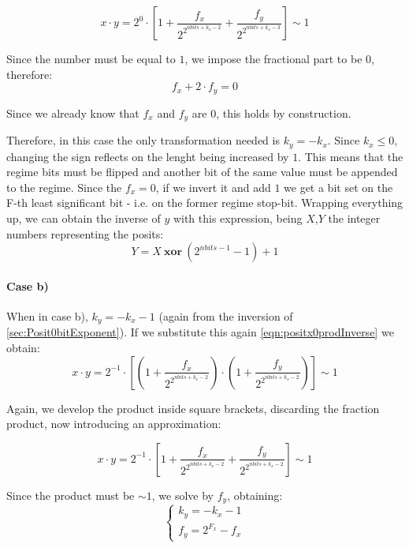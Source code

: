 \begin{equation}
    x \cdot y = 2^{0} \cdot \left[ 1 + \frac{f_x}{2^{2^{nbits + k_x - 2}}}  + \frac{f_y}{2^{2^{nbits + k_x - 3}}} \right] \sim 1
\end{equation}

Since the number must be equal to $1$, we impose the fractional part to be $0$, therefore:
\begin{equation}
    f_x + 2\cdot f_y = 0
\end{equation}

Since we already know that $f_x$ and $f_y$ are $0$, this holds by construction. 

Therefore, in this case the only transformation needed is $k_y = -k_x$. Since $k_x \leq 0$, changing the sign reflects on the lenght being increased by $1$. This means that the regime bits must be flipped and another bit of the same value must be appended to the regime. Since the $f_x = 0$, if we invert it and add $1$ we get a bit set on the F-th least significant bit - i.e. on the former regime stop-bit. Wrapping everything up, we can obtain the inverse of $y$ with this expression, being $X$,$Y$ the integer numbers representing the posits:
\begin{equation}
    Y = X\ \mathbf{xor}\ (2^{nbits - 1} - 1) + 1
\end{equation}

\paragraph{Case b)} When in case b), $k_y = -k_x - 1$ (again from the inversion of \eqref{sec:Posit0bitExponent}). If we substitute this again \eqref{eqn:positx0prodInverse} we obtain:
\begin{equation}
    x \cdot y = 2^{-1} \cdot \left[ \left (1 + \frac{f_x}{2^{2^{nbits + k_x - 2}}} \right ) \cdot \left (1 + \frac{f_y}{2^{2^{nbits + k_x - 2}}} \right ) \right] \sim 1
\end{equation}

Again, we develop the product inside square brackets, discarding the fraction product, now introducing an approximation:

\begin{equation}
    x \cdot y = 2^{-1} \cdot \left[ 1 + \frac{f_x}{2^{2^{nbits + k_x - 2}}}  + \frac{f_y}{2^{2^{nbits + k_x - 2}}} \right] \sim 1
\end{equation}

Since the product must be $\sim 1$, we solve by $f_y$, obtaining:
\begin{equation}
\left\{\begin{matrix}
k_y = -k_x - 1 \\
f_y = 2^{F_x} - f_x
\end{matrix}\right.
\end{equation}

